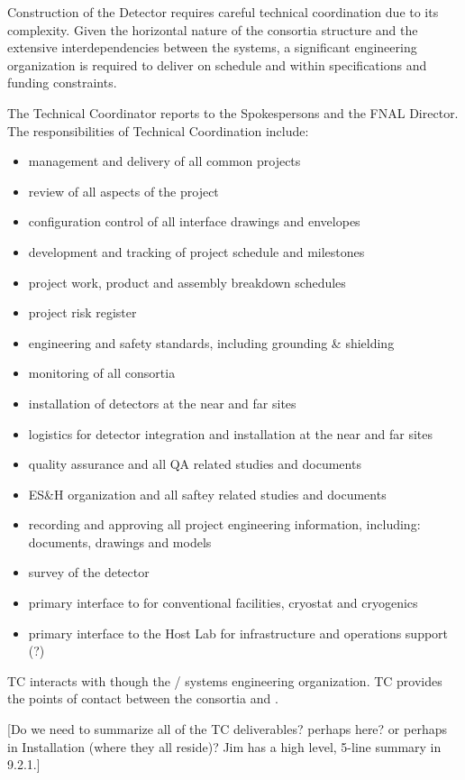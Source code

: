 


Construction of the  Detector
requires careful technical coordination due to its complexity.
Given the horizontal nature of the consortia structure and the
extensive interdependencies between the systems, a significant
engineering organization is required to deliver  on
schedule and within specifications and funding constraints.


The  Technical Coordinator reports to the 
Spokespersons and the FNAL Director. The responsibilities of Technical
Coordination include:
\begin{itemize}
  \item management and delivery of all common projects
  \item review of all aspects of the project
  \item configuration control of all interface drawings and envelopes
  \item development and tracking of project schedule and milestones
  \item project work, product and assembly breakdown schedules
  \item project risk register
  \item {} engineering and safety standards, including grounding \& shielding
  \item monitoring of all consortia
  \item installation of detectors at the near and far sites
  \item logistics for detector integration and installation at the near and far sites
  \item quality assurance and all QA related studies and documents
  \item ES\&H organization and all saftey related studies and documents
  \item recording and approving all project engineering information, including: documents, drawings and models
  \item survey of the detector
  \item primary interface to  for conventional facilities, cryostat and cryogenics
  \item primary interface to the Host Lab for infrastructure and operations support (?)
\end {itemize}

 TC interacts with  though the / systems engineering
organization. TC provides the points of contact between the consortia
and .

[Do we need to summarize all of the TC deliverables? perhaps here? or
  perhaps in Installation (where they all reside)? Jim has a high
  level, 5-line summary in 9.2.1.]





